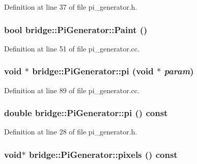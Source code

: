 Definition at line 37 of file pi\_\-generator.h.

\hypertarget{classbridge_1_1_pi_generator_a7d6deb8aca71aa7c3692894f489afd30}{
\subsubsection[{Paint}]{\setlength{\rightskip}{0pt plus 5cm}bool bridge::PiGenerator::Paint ()}}
\label{classbridge_1_1_pi_generator_a7d6deb8aca71aa7c3692894f489afd30}


Definition at line 51 of file pi\_\-generator.cc.

\hypertarget{classbridge_1_1_pi_generator_a869dcf4a6fb5598feece0d4d184caf23}{
\subsubsection[{pi}]{\setlength{\rightskip}{0pt plus 5cm}void $\ast$ bridge::PiGenerator::pi (void $\ast$ {\em param})}}
\label{classbridge_1_1_pi_generator_a869dcf4a6fb5598feece0d4d184caf23}


Definition at line 89 of file pi\_\-generator.cc.

\hypertarget{classbridge_1_1_pi_generator_ac477983021d094e067edb005af305212}{
\subsubsection[{pi}]{\setlength{\rightskip}{0pt plus 5cm}double bridge::PiGenerator::pi () const}}
\label{classbridge_1_1_pi_generator_ac477983021d094e067edb005af305212}


Definition at line 28 of file pi\_\-generator.h.

\hypertarget{classbridge_1_1_pi_generator_a51490d5ee5ac9c1beb10459643f7083a}{
\subsubsection[{pixels}]{\setlength{\rightskip}{0pt plus 5cm}void$\ast$ bridge::PiGenerator::pixels () const}}
\label{classbridge_1_1_pi_generator_a51490d5ee5ac9c1beb10459643f7083a}


